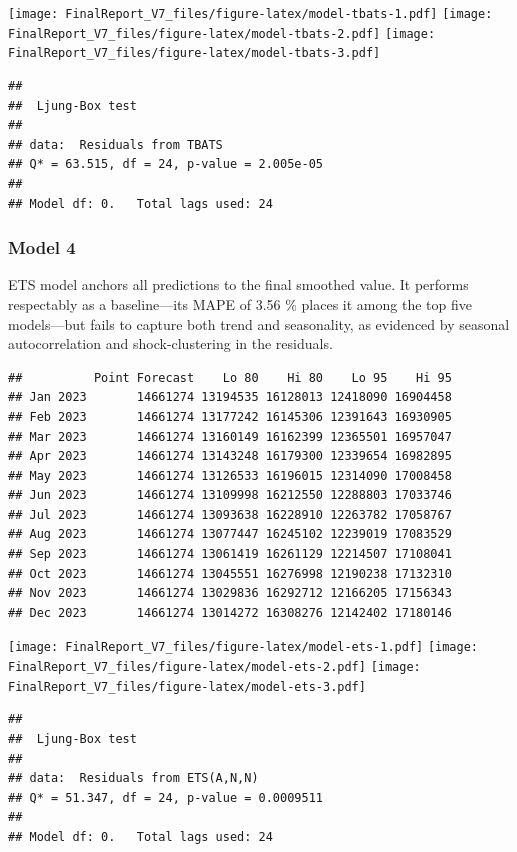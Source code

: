 \documentclass[
]{article}
\begin{document}
\texttt{[image: FinalReport\_V7\_files/figure-latex/model-tbats-1.pdf]}
\texttt{[image: FinalReport\_V7\_files/figure-latex/model-tbats-2.pdf]}
\texttt{[image: FinalReport\_V7\_files/figure-latex/model-tbats-3.pdf]}

\begin{verbatim}
## 
##  Ljung-Box test
## 
## data:  Residuals from TBATS
## Q* = 63.515, df = 24, p-value = 2.005e-05
## 
## Model df: 0.   Total lags used: 24
\end{verbatim}

\subsubsection{Model 4}\label{model-4}

ETS model anchors all predictions to the final smoothed value. It
performs respectably as a baseline---its MAPE of 3.56 \% places it among
the top five models---but fails to capture both trend and seasonality,
as evidenced by seasonal autocorrelation and shock‐clustering in the
residuals.

\begin{verbatim}
##          Point Forecast    Lo 80    Hi 80    Lo 95    Hi 95
## Jan 2023       14661274 13194535 16128013 12418090 16904458
## Feb 2023       14661274 13177242 16145306 12391643 16930905
## Mar 2023       14661274 13160149 16162399 12365501 16957047
## Apr 2023       14661274 13143248 16179300 12339654 16982895
## May 2023       14661274 13126533 16196015 12314090 17008458
## Jun 2023       14661274 13109998 16212550 12288803 17033746
## Jul 2023       14661274 13093638 16228910 12263782 17058767
## Aug 2023       14661274 13077447 16245102 12239019 17083529
## Sep 2023       14661274 13061419 16261129 12214507 17108041
## Oct 2023       14661274 13045551 16276998 12190238 17132310
## Nov 2023       14661274 13029836 16292712 12166205 17156343
## Dec 2023       14661274 13014272 16308276 12142402 17180146
\end{verbatim}

\texttt{[image: FinalReport\_V7\_files/figure-latex/model-ets-1.pdf]}
\texttt{[image: FinalReport\_V7\_files/figure-latex/model-ets-2.pdf]}
\texttt{[image: FinalReport\_V7\_files/figure-latex/model-ets-3.pdf]}

\begin{verbatim}
## 
##  Ljung-Box test
## 
## data:  Residuals from ETS(A,N,N)
## Q* = 51.347, df = 24, p-value = 0.0009511
## 
## Model df: 0.   Total lags used: 24
\end{verbatim}
\end{document}
